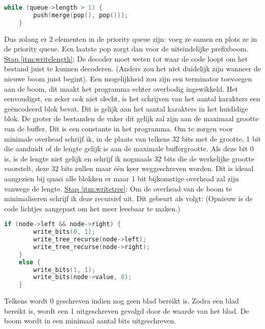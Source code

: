 \documentclass[11pt, a4paper]{article}
\begin{document}
\begin{lstlisting}[language=C]
	while (queue->length > 1) {
		push(merge(pop(), pop()));
	}
\end{lstlisting}
Dus zolang er 2 elementen in de priority queue zijn: voeg ze samen en plots ze in de priority queue. Een laatste pop zorgt dan voor de uiteindelijke prefixboom.
\newline\underline{Stap \ref{itm:writelength}}: 
De decoder moet weten tot waar de code loopt om het bestand juist te kunnen decoderen. (Anders zou het niet duidelijk zijn wanneer de nieuwe boom juist begint). Een mogelijkheid zou zijn een terminator toevoegen aan de boom, dit maakt het programma echter overbodig ingewikkeld. Het eenvoudigst, en zeker ook niet slecht, is het schrijven van het aantal karakters een ge\"{e}ncodeerd blok bevat. Dit is gelijk aan het aantal karakters in het huididige blok. De groter de bestanden de vaker dit gelijk zal zijn aan de maximaal grootte van de buffer. Dit is een constante in het programma. Om te zorgen voor minimale overhead schrijf ik, in de plaats van telkens 32 bits met de grootte, 1 bit die aanduidt of de lengte gelijk is aan de maximale buffergrootte. Als deze bit 0 is, is de lengte niet gelijk en schrijf ik nogmaals 32 bits die de werkelijke grootte voorstelt, deze 32 bits zullen maar \'{e}\'{e}n keer weggeschreven worden. Dit is ideaal aangezien bij quasi alle blokken er maar 1 bit bijkomstige overhead zal zijn vanwege de lengte. 
\newline\underline{Stap \ref{itm:writetree}}: Om de overhead van de boom te minimaliseren schrijf ik deze recursief uit. Dit gebeurt als volgt: (Opnieuw is de code lichtjes aangepast om het meer leesbaar te maken.)
\begin{lstlisting}[language=C]
	if (node->left && node->right) {
		write_bits(0, 1);
		write_tree_recurse(node->left);
		write_tree_recurse(node->right);
	}
	else {
		write_bits(1, 1);
		write_bits(node->value, 8);
	}
\end{lstlisting}
Telkens wordt 0 geschreven indien nog geen blad bereikt is. Zodra een blad bereikt is, wordt een 1 uitgeschreven gevolgd door de waarde van het blad. 
De boom wordt in een minimaal aantal bits uitgeschreven. 
\end{document}
